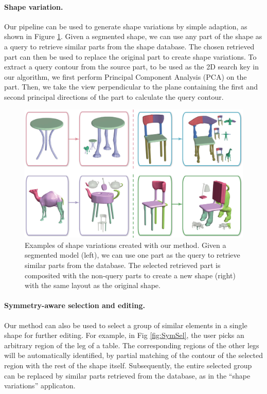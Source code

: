 \paragraph*{Shape variation.} Our pipeline can be used to generate shape variations by simple adaption, as shown in Figure \ref{fig:SegedAsInput}. Given a segmented shape, we can use any part of the shape as a query to retrieve similar parts from the shape database. The chosen retrieved part can then be used to replace the original part to create shape variations. To extract a query contour from the source part, to be used as the 2D search key in our algorithm, we first perform Principal Component Analysis (PCA) on the part. Then, we take the view perpendicular to the plane containing the first and second principal directions of the part to calculate the query contour.

\begin{figure}\centering
\includegraphics[width=\linewidth]{./Material/ShapeVariation.pdf}
\caption{Examples of shape variations created with our method. Given a segmented model (left), we can use one part as the query to retrieve similar parts from the database. The selected retrieved part is composited with the non-query parts to create a new shape (right) with the same layout as the original shape.}\label{fig:SegedAsInput}
\end{figure}

\paragraph*{Symmetry-aware selection and editing.} Our method can also be used to select a group of similar elements in a single shape for further editing. For example, in Fig \ref{fig:SymSel}, the user picks an arbitrary region of the leg of a table. The corresponding regions of the other legs will be automatically identified, by partial matching of the contour of the selected region with the rest of the shape itself. Subsequently, the entire selected group can be replaced by similar parts retrieved from the database, as in the ``shape variations'' applicaton.

